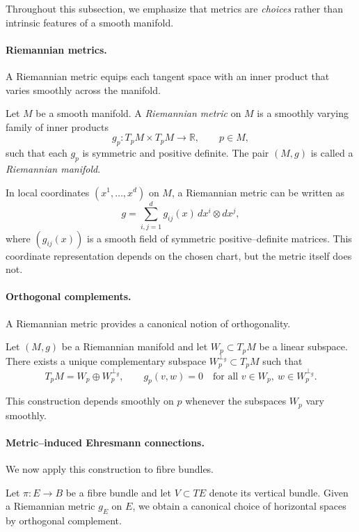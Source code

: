Throughout this subsection, we emphasize that metrics are \emph{choices} rather than
intrinsic features of a smooth manifold.

\paragraph{Riemannian metrics.}
A Riemannian metric equips each tangent space with an inner product that varies smoothly
across the manifold.

\begin{gdefn}
Let $M$ be a smooth manifold.
A \emph{Riemannian metric} on $M$ is a smoothly varying family of inner products
\[
g_p : T_pM \times T_pM \longrightarrow \mathbb{R},
\qquad p\in M,
\]
such that each $g_p$ is symmetric and positive definite.
The pair $(M,g)$ is called a \emph{Riemannian manifold}.
\end{gdefn}

In local coordinates $(x^1,\dots,x^d)$ on $M$, a Riemannian metric can be written as
\[
g
=
\sum_{i,j=1}^d g_{ij}(x)\,dx^i\otimes dx^j,
\]
where $(g_{ij}(x))$ is a smooth field of symmetric positive--definite matrices.
This coordinate representation depends on the chosen chart, but the metric itself does
not.

\paragraph{Orthogonal complements.}
A Riemannian metric provides a canonical notion of orthogonality.

\begin{gprop}
Let $(M,g)$ be a Riemannian manifold and let $W_p\subset T_pM$ be a linear subspace.
There exists a unique complementary subspace $W_p^{\perp_g}\subset T_pM$ such that
\[
T_pM = W_p \oplus W_p^{\perp_g},
\qquad
g_p(v,w)=0
\quad \text{for all } v\in W_p,\ w\in W_p^{\perp_g}.
\]
\end{gprop}

This construction depends smoothly on $p$ whenever the subspaces $W_p$ vary smoothly.

\paragraph{Metric--induced Ehresmann connections.}
We now apply this construction to fibre bundles.

Let $\pi:E\to B$ be a fibre bundle and let $V\subset TE$ denote its vertical bundle.
Given a Riemannian metric $g_E$ on $E$, we obtain a canonical choice of horizontal spaces
by orthogonal complement.

